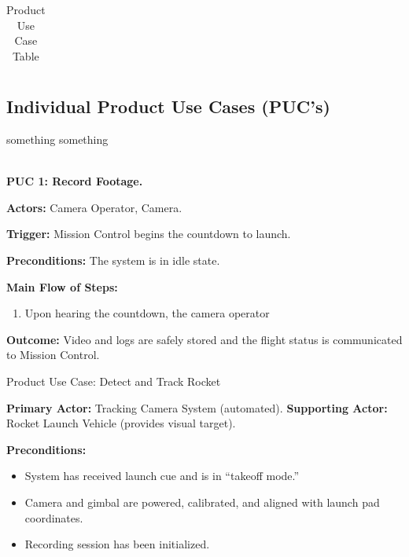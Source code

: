 \documentclass[12pt]{article}
\begin{document}
\begin{table}[H]
\begin{tabularx}{\textwidth}{p{0.4in}p{0.4in}p{1.25in}p{1in}X}
    \bottomrule
  \end{tabularx}
  \caption{Product Use Case Table}
  \label{tab:product-use-case-table}
\end{table}

\subsection{Individual Product Use Cases (PUC's)}

something something

~\\

\textbf{PUC 1: Record Footage.}

\textbf{Actors:} Camera Operator, Camera.

\textbf{Trigger:} Mission Control begins the countdown to launch.

\textbf{Preconditions:} The system is in idle state.

\textbf{Main Flow of Steps:}
\begin{enumerate}
  \item Upon hearing the countdown, the camera operator
\end{enumerate}

\textbf{Outcome:} Video and logs are safely stored and the flight status is communicated to Mission Control.

Product Use Case: Detect and Track Rocket

\textbf{Primary Actor:} Tracking Camera System (automated).
\textbf{Supporting Actor:} Rocket Launch Vehicle (provides visual target).

\textbf{Preconditions:}
\begin{itemize}
  \item System has received launch cue and is in ``takeoff mode.''
  \item Camera and gimbal are powered, calibrated, and aligned with launch pad
        coordinates.
  \item Recording session has been initialized.
\end{itemize}
\end{document}
